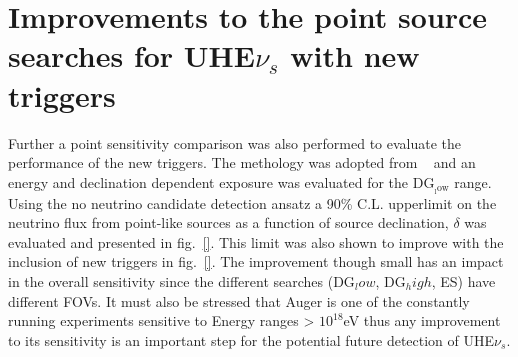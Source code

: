 \section*{Improvements to the point source searches for UHE$\nu_s$ with new triggers}
Further a point sensitivity comparison was also performed to evaluate the performance of the new triggers. The methology was adopted from ~\cite{Aab_2019_point} and an energy and declination dependent exposure was evaluated for the DG$\mathrm{_{_low}}$ range. Using the no neutrino candidate detection ansatz a 90\% C.L. upperlimit on the neutrino flux from point-like sources as a function of source declination, $\delta$ was evaluated and presented in fig.~\ref{}. This limit was also shown to improve with the inclusion of new triggers in fig.~\ref{}. The improvement though small has an impact in the overall sensitivity since the different searches (DG$_low$, DG$_high$, ES) have different FOVs. It must also be stressed that Auger is one of the constantly running experiments sensitive to Energy ranges > $10^{18}$eV thus any improvement to its sensitivity is an important step for the potential future detection of UHE$\nu_s$.



